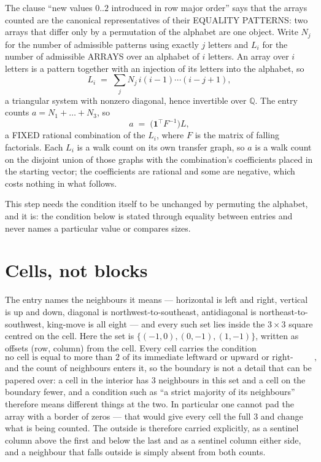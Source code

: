 \documentclass[11pt,a4paper]{article}
\theoremstyle{plain}
\theoremstyle{definition}
\begin{document}
The clause ``new values $0..2$ introduced in row major order'' says that the arrays
counted are the canonical representatives of their EQUALITY PATTERNS: two arrays that differ
only by a permutation of the alphabet are one object. Write $N_j$ for the number of admissible
patterns using exactly $j$ letters and $L_i$ for the number of admissible ARRAYS over an
alphabet of $i$ letters. An array over $i$ letters is a pattern together with an injection of
its letters into the alphabet, so
\[
L_i\;=\;\sum_{j}N_j\,i(i-1)\cdots(i-j+1),
\]
a triangular system with nonzero diagonal, hence invertible over $\mathbb{Q}$. The entry
counts $a=N_1+\dots+N_{3}$, so
\[
a\;=\;\bigl(\mathbf{1}^{\!\top}F^{-1}\bigr)L ,
\]
a FIXED rational combination of the $L_i$, where $F$ is the matrix of falling factorials.
Each $L_i$ is a walk count on its own transfer graph, so $a$ is a walk count on the disjoint
union of those graphs with the combination's coefficients placed in the starting vector; the
coefficients are rational and some are negative, which costs nothing in what follows.

This step needs the condition itself to be unchanged by permuting the alphabet, and it is:
the condition below is stated through equality between entries and never names a particular
value or compares sizes.

\section{Cells, not blocks}

The entry names the neighbours it means --- horizontal is left and right, vertical is up and
down, diagonal is northwest-to-southeast, antidiagonal is northeast-to-southwest, king-move is
all eight --- and every such set lies inside the $3\times3$ square centred on the cell. Here
the set is $\{(-1,0), (0,-1), (1,-1)\}$, written as offsets (row, column) from the cell. Every cell carries
the condition
\[
\text{no cell is equal to more than 2 of its immediate leftward or upward or right-upward antidiagonal neighbours},
\]
and the count of neighbours enters it, so the boundary is not a detail that can be papered
over: a cell in the interior has $3$ neighbours in this set and a cell on the boundary
fewer, and a condition such as ``a strict majority of its neighbours'' therefore means
different things at the two. In particular one cannot pad the array with a border of zeros ---
that would give every cell the full $3$ and change what is being counted. The outside is
therefore carried
explicitly, as a sentinel column above the first and below the last and as a sentinel column
either side, and a neighbour that falls outside is simply absent from both counts.
\end{document}
